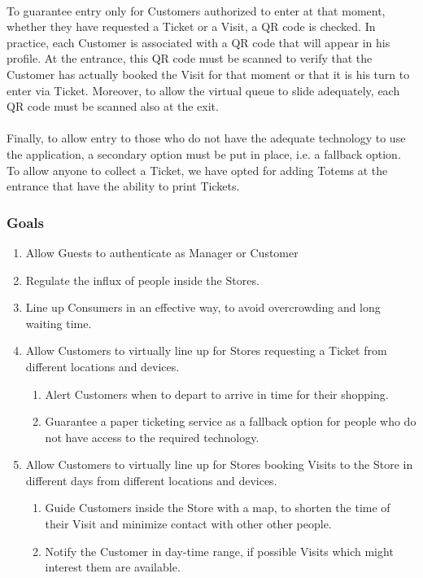 \documentclass[a4paper, 10pt, oneside]{article}
\begin{document}
\\
To guarantee entry only for Customers authorized to enter at that moment, whether they have requested a Ticket or a Visit, a QR code is checked. In practice, each Customer is associated with a QR code that will appear in his profile. At the entrance, this QR code must be scanned to verify that the Customer has actually booked the Visit for that moment or that it is his turn to enter via Ticket. Moreover, to allow the virtual queue to slide adequately, each QR code must be scanned also at the exit.\\
\\
Finally, to allow entry to those who do not have the adequate technology to use the application, a secondary option must be put in place, i.e. a fallback option. To allow anyone to collect a Ticket, we have opted for adding Totems at the entrance that have the ability to print Tickets.
\newline
\newline
\newline
\subsubsection{Goals}

\begin{enumerate}[label={G.\arabic{*}}]
    \item \label{goal:auth} Allow Guests to authenticate as Manager or Customer
    \item \label{goal:influx} Regulate the influx of people inside the Stores.
    \item \label{goal:effectiveQueue} Line up Consumers in an effective way, to avoid overcrowding and long waiting time.
    \item \label{goal:enqueue} Allow Customers to virtually line up for Stores requesting a Ticket from different locations and devices.
    \begin{enumerate}[label={\ref{goal:enqueue}.\arabic{*}}]
        \item \label{goal:enqueue:time} Alert Customers when to depart to arrive in time for their shopping.
        \item \label{goal:enqueue:fallback} Guarantee a paper ticketing service as a fallback option for people who do not have access to the required technology.
    \end{enumerate}
    \item \label{goal:visit} Allow Customers to virtually line up for Stores booking Visits to the Store in different days from different locations and devices.
    \begin{enumerate}[label={\ref{goal:visit}.\arabic{*}}]
        \item \label{goal:visit:path} Guide Customers inside the Store with a map, to shorten the time of their Visit and minimize contact with other other people.
        \item \label{goal:visit:notifications} Notify the Customer in day-time range, if possible Visits which might interest them are available.
    \end{enumerate}
\end{enumerate}
\end{document}
